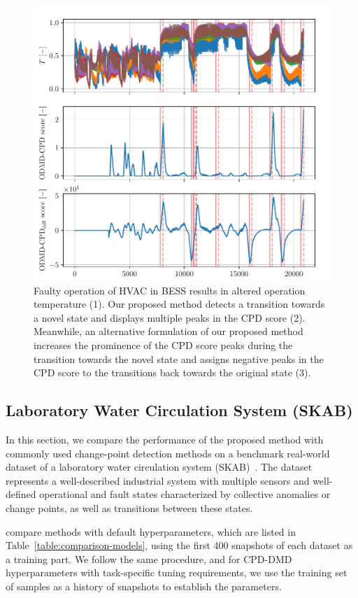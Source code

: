 \begin{figure}[H]
	\centering
	\includegraphics[width=\linewidth]{figures/bess-chd_p10-l2880_b240_t240roll_2880-dmd_w1.0-hx20.pdf}
	\caption{Faulty operation of HVAC in BESS results in altered operation temperature (1). Our proposed method detects a transition towards a novel state and displays multiple peaks in the CPD score (2). Meanwhile, an alternative formulation of our proposed method increases the prominence of the CPD score peaks during the transition towards the novel state and assigns negative peaks in the CPD score to the transitions back towards the original state (3).}\label{fig:bess}
\end{figure}

\subsection{Laboratory Water Circulation System (SKAB)}
In this section, we compare the performance of the proposed method with commonly used change-point detection methods on a benchmark real-world dataset of a laboratory water circulation system (SKAB)~\citep{Katser2020}. The dataset represents a well-described industrial system with multiple sensors and well-defined operational and fault states characterized by collective anomalies or change points, as well as transitions between these states.

\citet{Katser2020} compare methods with default hyperparameters, which are listed in Table~\ref{table:comparison-models}, using the first 400 snapshots of each dataset as a training part. We follow the same procedure, and for CPD-DMD hyperparameters with task-specific tuning requirements, we use the training set of samples as a history of snapshots to establish the parameters.

